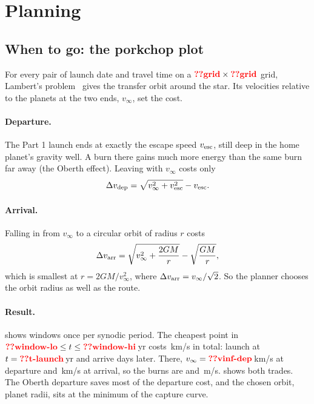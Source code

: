\documentclass[aps,prd,twocolumn,nofootinbib,floatfix,superscriptaddress]{revtex4-2}
\begin{document}

\section{Planning}\label{sec:plan}
\subsection{When to go: the porkchop plot}
For every pair of launch date and travel time on a $\val{grid}\times\val{grid}$ grid, Lambert's problem~\cite{izzo2015} gives the transfer orbit around the star.
Its velocities relative to the planets at the two ends, $v_\infty$, set the cost.

\paragraph{Departure.}
The Part 1 launch ends at exactly the escape speed $v_{\rm esc}$, still deep in the home planet's gravity well.
A burn there gains much more energy than the same burn far away (the Oberth effect).
Leaving with $v_\infty$ costs only
\begin{equation}
  \Delta v_{\rm dep}=\sqrt{v_\infty^2+v_{\rm esc}^2}-v_{\rm esc}.
\end{equation}

\paragraph{Arrival.}
Falling in from $v_\infty$ to a circular orbit of radius $r$ costs
\begin{equation}
  \Delta v_{\rm arr}=\sqrt{v_\infty^2+\frac{2GM}{r}}-\sqrt{\frac{GM}{r}},
\end{equation}
which is smallest at $r=2GM/v_\infty^2$, where $\Delta v_{\rm arr}=v_\infty/\sqrt2$.
So the planner chooses the orbit radius as well as the route.

\paragraph{Result.}
 shows windows once per synodic period.
The cheapest point in $\val{window-lo}\le t\le\val{window-hi}$\,yr costs \,km/s in total: launch at $t=\val{t-launch}$\,yr and arrive  days later.
There, $v_\infty=\val{vinf-dep}$\,km/s at departure and \,km/s at arrival, so the burns are  and \,m/s.
 shows both trades.
The Oberth departure saves most of the departure cost, and the chosen orbit,  planet radii, sits at the minimum of the capture curve.
\end{document}

